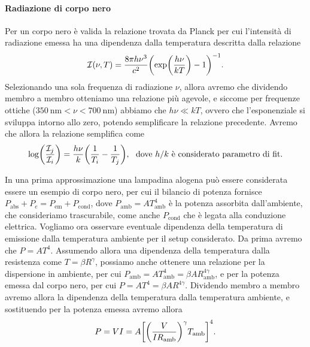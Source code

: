 \documentclass[a4paper, varvw, nofootinbib]{revtex4-2}
\begin{document}
\paragraph*{Radiazione di corpo nero} Per un corpo nero è valida la relazione trovata da Planck per cui l'intensità di radiazione emessa ha una dipendenza dalla temperatura descritta dalla relazione \begin{equation} \mathcal I(\nu, T) = \frac{8 \pi h \nu^3}{c^2}\qty(\exp(\frac{h\nu}{kT})-1)^{-1}.  \end{equation} Selezionando una sola frequenza di radiazione $\nu$, allora avremo che dividendo membro a membro otteniamo una relazione più agevole, e siccome per frequenze ottiche ($\SI{350}{\nano\metre} < \nu <\SI{700}{\nano\metre}$) abbiamo che $h\nu \ll kT$, ovvero che l'esponenziale si sviluppa intorno allo zero, potendo semplificare la relazione precedente. Avremo che allora la relazione semplifica come \begin{equation} \log(\frac{\mathcal I_j}{\mathcal I_i}) = \frac{h\nu}{k}\qty({1\over T_i} - {1\over T_j}),~\text{ dove $h/k$ è considerato parametro di fit.} \label{eq:3}\end{equation}

In una prima approssimazione una lampadina alogena può essere considerata essere un esempio di corpo nero, per cui il bilancio di potenza fornisce $P_\text{abs} + P_e = P_\text{em} + P_\text{cond}$, dove $P_\text{amb} = AT_\text{amb}^4$ è la potenza assorbita dall'ambiente, che consideriamo trascurabile, come anche $P_\text{cond}$ che è legata alla conduzione elettrica. 
Vogliamo ora osservare eventuale dipendenza della temperatura di emissione dalla temperatura ambiente per il setup considerato. Da prima avremo che $P = AT^4$. Assumendo allora una dipendenza della temperatura dalla resistenza come $T = \beta R^\gamma$, possiamo anche ottenere una relazione per la dispersione in ambiente, per cui $P_\text{amb} = AT_\text{amb}^4 = \beta A R^{4\gamma}_\text{amb}$, e per la potenza emessa dal corpo nero, per cui $P = AT^4 = \beta A R^{4\gamma}$. Dividendo membro a membro avremo allora la dipendenza della temperatura dalla temperatura ambiente, e sostituendo per la potenza emessa avremo allora \begin{equation} P = VI =  A \qty[\qty(\frac{V}{IR_\text{amb}})^\gamma T_\text{amb}]^4.\label{eq:4} \end{equation} 
\end{document}
